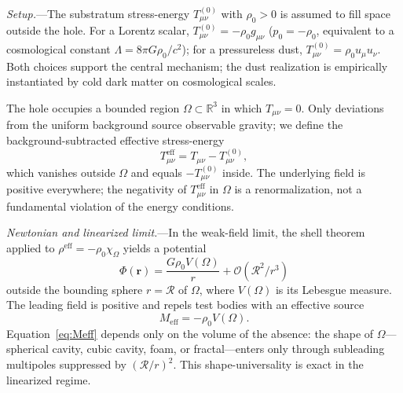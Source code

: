 \documentclass[%
  reprint,
  superscriptaddress,
  amsmath,amssymb,
  prl,
  floatfix,
  x11names
]{revtex4-2}
\begin{document}
\textit{Setup.}---The substratum stress-energy $T^{(0)}_{\mu\nu}$ with $\rho_0>0$ is assumed to fill space outside the hole. For a Lorentz scalar, $T^{(0)}_{\mu\nu}=-\rho_0 g_{\mu\nu}$ ($p_0=-\rho_0$, equivalent to a cosmological constant $\Lambda=8\pi G\rho_0/c^2$); for a pressureless dust, $T^{(0)}_{\mu\nu}=\rho_0 u_\mu u_\nu$. Both choices support the central mechanism; the dust realization is empirically instantiated by cold dark matter on cosmological scales.

The hole occupies a bounded region $\Omega\subset\mathbb{R}^3$ in which $T_{\mu\nu}=0$. Only deviations from the uniform background source observable gravity; we define the background-subtracted effective stress-energy
\begin{equation}
T^{\text{eff}}_{\mu\nu}=T_{\mu\nu}-T^{(0)}_{\mu\nu},
\label{eq:Teff}
\end{equation}
which vanishes outside $\Omega$ and equals $-T^{(0)}_{\mu\nu}$ inside. The underlying field is positive everywhere; the negativity of $T^{\text{eff}}_{\mu\nu}$ in $\Omega$ is a renormalization, not a fundamental violation of the energy conditions.

\textit{Newtonian and linearized limit.}---In the weak-field limit, the shell theorem applied to $\rho^{\text{eff}}=-\rho_0\chi_\Omega$ yields a potential
\begin{equation}
\Phi(\mathbf{r})=\frac{G\rho_0 V(\Omega)}{r}+\mathcal{O}(\mathcal{R}^2/r^3)
\label{eq:phi}
\end{equation}
outside the bounding sphere $r=\mathcal{R}$ of $\Omega$, where $V(\Omega)$ is its Lebesgue measure. The leading field is positive and repels test bodies with an effective source
\begin{equation}
M_{\text{eff}}=-\rho_0 V(\Omega).
\label{eq:Meff}
\end{equation}
Equation~\eqref{eq:Meff} depends only on the volume of the absence: the shape of $\Omega$---spherical cavity, cubic cavity, foam, or fractal---enters only through subleading multipoles suppressed by $(\mathcal{R}/r)^2$. This shape-universality is exact in the linearized regime.
\end{document}
